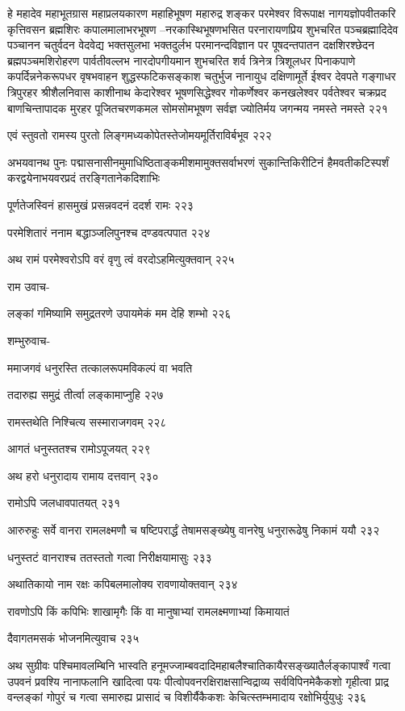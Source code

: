 हे महादेव महाभूतग्रास महाप्रलयकारण महाहिभूषण महारुद्र शङ्कर परमेश्वर विरूपाक्ष
नागयज्ञोपवीतकरि कृत्तिवसन ब्रह्मशिरः कपालमालाभरभूषण –नरकास्थिभूषणभसित
परनारायणप्रिय शुभचरित पञ्चब्रह्मादिदेव पञ्चानन चतुर्वदन वेदवेद्य भक्तसुलभा भक्तदुर्लभ
परमानन्दविज्ञान पर पूषदन्तपातन दक्षशिरश्छेदन ब्रह्मपञ्चमशिरोहरण पार्वतीवल्लभ
नारदोपगीयमान शुभचरित शर्व त्रिनेत्र त्रिशूलधर पिनाकपाणे कपर्दिन्ननेकरूपधर वृषभवाहन
शुद्धस्फटिकसङ्काश चतुर्भुज नानायुध दक्षिणामूर्ते ईश्वर देवपते गङ्गाधर त्रिपुरहर श्रीशैलनिवास
काशीनाथ केदारेश्वर भूषणसिद्धेश्वर गोकर्णेश्वर कनखलेश्वर पर्वतेश्वर चक्रप्रद बाणचिन्तापादक
मुरहर पूजितचरणकमल सोमसोमभूषण सर्वज्ञ ज्योतिर्मय जगन्मय नमस्ते नमस्ते २२१

एवं स्तुवतो रामस्य पुरतो लिङ्गमध्यकोपेतस्तेजोमयमूर्तिराविर्बभूव २२२

अभयवानथ पुनः पद्मासनासीनमुमाधिष्ठिताङ्कमीशमामुक्तसर्वाभरणं सुकान्तिकिरीटिनं
हैमवतीकटिस्पर्शं करद्वयेनाभयवरप्रदं तरङ्गितानेकदिशाभिः

पूर्णतेजस्विनं हासमुखं प्रसन्नवदनं ददर्श रामः २२३

परमेशितारं ननाम बद्धाञ्जलिपुनश्च दण्डवत्पपात २२४

अथ रामं परमेश्वरोऽपि वरं वृणु त्वं वरदोऽहमित्युक्तवान् २२५

राम उवाच-

लङ्कां गमिष्यामि समुद्रतरणे उपायमेकं मम देहि शम्भो २२६

शम्भुरुवाच-

ममाजगवं धनुरस्ति तत्कालरूपमविकल्पं वा भवति

तदारुह्य समुद्रं तीर्त्वा लङ्कामाप्नुहि २२७

रामस्तथेति निश्चित्य सस्माराजगवम् २२८

आगतं धनुस्ततश्च रामोऽपूजयत् २२९

अथ हरो धनुरादाय रामाय दत्तवान् २३०

रामोऽपि जलधावपातयत् २३१

आरुरुहुः सर्वे वानरा रामलक्ष्मणौ च षष्टिपरार्द्धं तेषामसङ्ख्येषु वानरेषु धनुरारूढेषु निकामं ययौ
 २३२

धनुस्तटं वानराश्च ततस्ततो गत्वा निरीक्षयामासुः २३३

अथातिकायो नाम रक्षः कपिबलमालोक्य रावणायोक्तवान् २३४

रावणोऽपि किं कपिभिः शाखामृगैः किं वा मानुषाभ्यां रामलक्ष्मणाभ्यां किमायातं

दैवागतमसकं भोजनमित्युवाच २३५

अथ सुग्रीवः पश्चिमावलम्बिनि भास्वति हनूमज्जाम्बवदादिमहाबलैश्चातिकायैरसङ्ख्यातैर्लङ्कापार्श्वं
गत्वा उपवनं प्रवश्यि नानाफलानि खादित्वा पयः पीत्वोपवनरक्षिराक्षसान्विद्राव्य
सर्वविपिनमेकैकशो गृहीत्वा प्राद्र वन्लङ्कां गोपुरं च गत्वा समारुह्य प्रासादं च विशीर्यैकैकशः
केचित्स्तम्भमादाय रक्षोभिर्युयुधुः २३६

